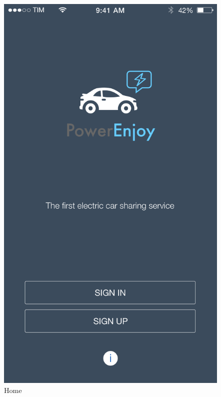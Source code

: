 \documentclass[12pt]{article}
\begin{document}
		\begin{figure}
		 \vspace{-17cm}	
		 \centering	
		 \includegraphics[scale=0.25]{Images/mobileApp/Home.png}
		 \caption{Home}
		 \endminipage
		 \centering

\end{figure}
\end{document}
